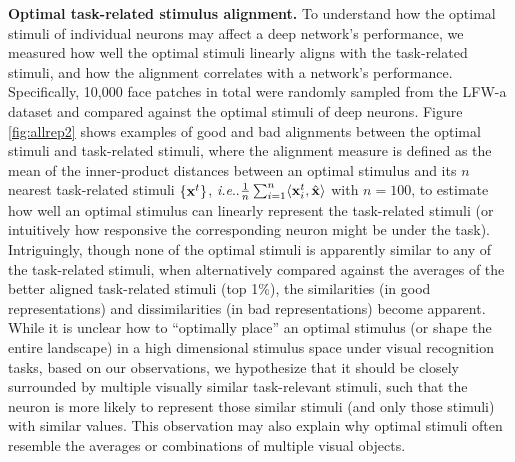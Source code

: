 \documentclass[fleqn]{article} %
\makeatletter
\DeclareRobustCommand\onedot{\futurelet\@let@token\@onedot}
\def\@onedot{\ifx\@let@token.\else.\null\fi\xspace}
\def\ie{\emph{i.e}\onedot} \def\Ie{\emph{I.e}\onedot}
\makeatother
\begin{document}
{\bf Optimal \vs task-related stimulus alignment.}
To understand how the optimal stimuli of individual neurons may affect a deep network's performance, we {measured} how well the optimal stimuli linearly aligns with the task-related stimuli, and how the alignment correlates with a network's performance.
Specifically, 10,000 face patches in total {were} randomly sampled from the LFW-a dataset and compared against the optimal stimuli of deep neurons.
Figure \ref{fig:allrep2} shows examples of good and bad alignments between the optimal stimuli and task-related stimuli, where the alignment measure is defined as the mean of the inner-product distances between an optimal stimulus and its $n$ nearest task-related stimuli $\left\lbrace {\bf{x}}^{t} \right\rbrace$, \ie $\frac{1}{n}\sum_{i=1}^{n} \langle {\bf{x}}^{t}_{i} , \hat{{\bf{x}}} \rangle$ with $n=100$, to estimate how well an optimal stimulus can linearly represent the task-related stimuli (or intuitively how responsive the corresponding neuron might be under the task).
Intriguingly, though none of the optimal stimuli is apparently similar to any of the task-related stimuli, when alternatively compared against the averages of the better aligned task-related stimuli (top 1\%), the similarities (in good representations) and dissimilarities (in bad representations) become apparent.
While it is unclear how to ``optimally place'' an optimal stimulus (or shape the entire landscape) in a high dimensional stimulus space under visual recognition tasks, based on our observations, we hypothesize that it should be closely surrounded by multiple visually similar task-relevant stimuli, such that the neuron is more likely to represent those similar stimuli (and only those stimuli) with similar values.
This observation may also explain why optimal stimuli often resemble the averages \cite{le2012building} or combinations \cite{simonyan2013deep} of multiple visual objects.

\end{document}
